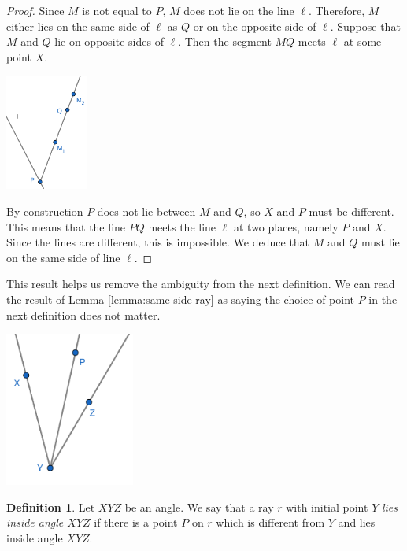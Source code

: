 \documentclass{tufte-handout}
\theoremstyle{definition}
\newtheorem{definition}[theorem]{Definition}
\begin{document}
\begin{proof}
Since $M$ is not equal to $P$, $M$ does not lie on the line $\ell$. Therefore, $M$ either lies on the same side of $\ell$ as $Q$ or on the opposite side of $\ell$. Suppose that $M$ and $Q$ lie on opposite sides of $\ell$. Then the segment $MQ$ meets $\ell$ at some point $X$.

\begin{marginfigure}
  \includegraphics[height=1.5in]{images/oneside.png}
\end{marginfigure}


By construction $P$ does not lie between $M$ and $Q$, so $X$ and $P$ must be different. This means that the line $PQ$ meets the line $\ell$ at two places, namely $P$ and $X$. Since the lines are different, this is impossible. We deduce that $M$ and $Q$ must lie on the same side of line $\ell$.
\end{proof}

This result helps us remove the ambiguity from the next definition. We can read the result of Lemma \ref{lemma:same-side-ray} as saying the choice of point $P$ in the next definition does not matter.

\begin{marginfigure}
  \includegraphics[height=2in]{images/ray_inside_angle.png}
\end{marginfigure}



\begin{definition}
Let $XYZ$ be an angle. We say that a ray $r$ with initial point $Y$ \emph{lies inside angle $XYZ$} if there is a point $P$ on $r$ which is different from $Y$ and lies inside angle $XYZ$.
\end{definition}
\end{document}
